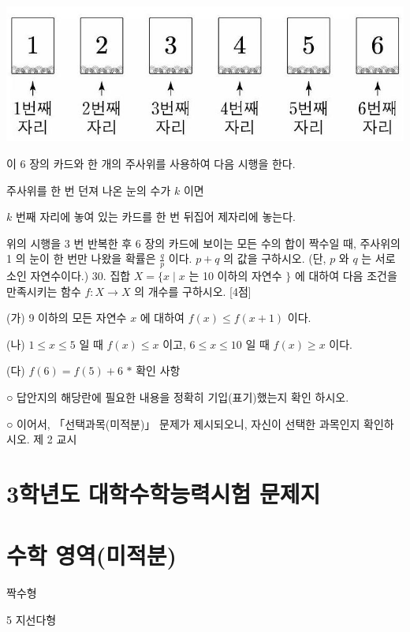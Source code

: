 \documentclass[10pt]{article}
\begin{document}
\begin{center}
\includegraphics[max width=\textwidth]{2023_06_06_b380aa8523ec7afae994g-32}
\end{center}

이 6 장의 카드와 한 개의 주사위를 사용하여 다음 시행을 한다.

주사위를 한 번 던져 나온 눈의 수가 $k$ 이면

$k$ 번째 자리에 놓여 있는 카드를 한 번 뒤집어 제자리에 놓는다.

위의 시행을 3 번 반복한 후 6 장의 카드에 보이는 모든 수의 합이 짝수일 때, 주사위의 1 의 눈이 한 번만 나왔을 확률은 $\frac{q}{p}$ 이다. $p+q$ 의 값을 구하시오. (단, $p$ 와 $q$ 는 서로소인 자연수이다.) 30. 집합 $X=\{x \mid x$ 는 10 이하의 자연수 $\}$ 에 대하여 다음 조건을 만족시키는 함수 $f: X \rightarrow X$ 의 개수를 구하시오. [4점]

(가) 9 이하의 모든 자연수 $x$ 에 대하여 $f(x) \leq f(x+1)$ 이다.

(나) $1 \leq x \leq 5$ 일 때 $f(x) \leq x$ 이고, $6 \leq x \leq 10$ 일 때 $f(x) \geq x$ 이다.

(다) $f(6)=f(5)+6$ $*$ 확인 사항

○ 답안지의 해당란에 필요한 내용을 정확히 기입(표기)했는지 확인 하시오.

○ 이어서, 「선택과목(미적분)」 문제가 제시되오니, 자신이 선택한 과목인지 확인하시오. 제 2 교시

\section{3학년도 대학수학능력시험 문제지}
\section{수학 영역(미적분)}
짝수형

5 지선다형
\end{document}
